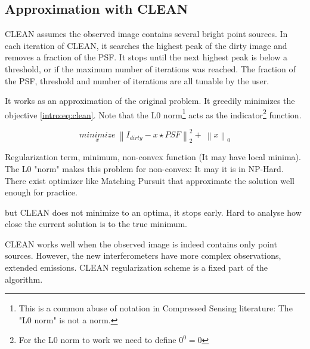 \subsection{Approximation with CLEAN}
CLEAN assumes the observed image contains several bright point sources. In each iteration of CLEAN, it searches the highest peak of the dirty image and removes a fraction of the PSF. It stops until the next highest peak is below a threshold, or if the maximum number of iterations was reached. The fraction of the PSF, threshold and number of iterations are all tunable by the user.

It works as an approximation of the original problem. It greedily minimizes the objective \eqref{intro:eq:clean}. 
Note that the L0 norm\footnote{This is a common abuse of notation in Compressed Sensing literature: The "L0 norm" is not a norm.} acts as the indicator\footnote{For the L0 norm to work we need to define $0^0 = 0$} function.

\begin{equation}\label{intro:eq:clean}
\underset{x}{minimize} \: \left \| I_{dirty} - x \star PSF \right \|_2^2 + \: \left \| x \right \|_0
\end{equation}

Regularization term, minimum, non-convex function (It may have local minima). 
The L0 "norm" makes this problem for non-convex: It may  it is in NP-Hard. There exist optimizer like Matching Pursuit that approximate the solution well enough for practice.

but CLEAN does not minimize to an optima, it stops early. Hard to analyse how close the current solution is to the true minimum.

CLEAN works well when the observed image is indeed contains only point sources. However, the new interferometers have more complex observations, extended emissions. CLEAN regularization scheme is a fixed part of the algorithm. 



